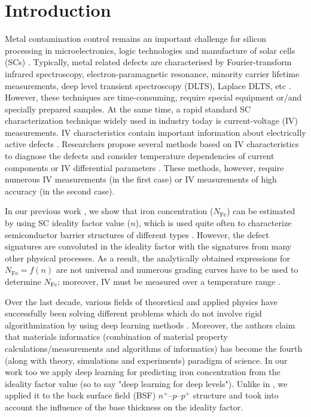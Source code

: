 \documentclass[num-refs]{wiley-article} %
\begin{document}
\section{Introduction}\label{sec:intro}
Metal contamination control remains an important challenge
for silicon processing in microelectronics, logic technologies
and manufacture of solar cells (SCs) \cite{Claers2018,ZHU2016192,FeB:Schmidt,IronSC}.
Typically, metal related defects are  characterised
by Fourier-transform infrared spectroscopy,
electron-paramagnetic resonance,
minority carrier lifetime measurements,
deep level transient spectroscopy (DLTS),
Laplace DLTS, etc \cite{Schroder2006,HowMuchPhysics,LaplDLTS}.
However, these techniques are time-consuming, require special equipment or/and specially prepared samples.
At the same time, a rapid standard SC characterization technique
widely used in industry today is current-voltage (IV) measurements.
IV characteristics contain important information about electrically active defects \cite{HowMuchPhysics,BulyarJAP}.
Researchers propose several methods based on IV characteristics to diagnose
the defects \cite{HowMuchPhysics,BulyarJAP,BulyarSSE,Claeys2019,simoen2007}
and consider temperature dependencies of current components  \cite{Claeys2019,simoen2007}
or IV differential parameters \cite{BulyarJAP,BulyarSSE}.
These methods, however, require numerous IV measurements (in the first case)
or IV measurements of high accuracy (in the second case).

In our previous work \cite{Olikh2019SM},
we show that iron concentration ($N_{\mathrm{Fe}}$) can be estimated
by using SC ideality factor value ($n$),
which is used quite often to characterize semiconductor
barrier structures of different types \cite{Heide,Duan,n_CharGaN,n_CharSemic,n_CharPhysRevAppl}.
However, the defect signatures are convoluted in the ideality factor
with the signatures from many other physical processes.
As a result, the analytically obtained expressions for  $N_{\mathrm{Fe}}=f(n)$
are not universal and numerous grading curves have to be used to
determine $N_{\mathrm{Fe}}$;
moreover,   IV must be measured  over a temperature range \cite{Olikh2019SM}.

Over the last decade,
various fields of theoretical and applied physics
have successfully been solving different problems
which do not involve rigid algorithmization
by using deep learning methods  \cite{MachLean_RevModPhys,MachLeanJAP,MachLeanPPV}.
Moreover, the authors claim \cite{MI_JAP}  that materials informatics (combination of material property
calculations/measurements and algorithms of informatics)
has become the fourth (along with theory, simulations and experiments) paradigm of science.
In our work too we apply deep learning for predicting iron concentration
from the ideality factor value (so to say "deep learning for deep levels").
Unlike in \cite{Olikh2019SM}, we applied it
to the back surface field (BSF) $n^+$--$p$--$p^+$ structure
and took into account the influence of the base thickness on the ideality factor.
\end{document}
